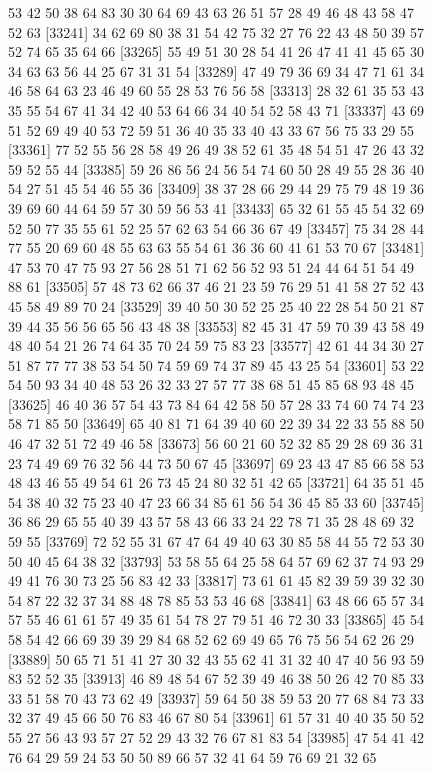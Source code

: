 \documentclass{article}
\begin{document}
\begin{figure}[H]
\begin{Schunk}
\begin{Soutput}
[33217] 53 42 50 38 64 83 30 30 64 69 43 63 26 51 57 28 49 46 48 43 58 47 52 63
[33241] 34 62 69 80 38 31 54 42 75 32 27 76 22 43 48 50 39 57 52 74 65 35 64 66
[33265] 55 49 51 30 28 54 41 26 47 41 41 45 65 30 34 63 63 56 44 25 67 31 31 54
[33289] 47 49 79 36 69 34 47 71 61 34 46 58 64 63 23 46 49 60 55 28 53 76 56 58
[33313] 28 32 61 35 53 43 35 55 54 67 41 34 42 40 53 64 66 34 40 54 52 58 43 71
[33337] 43 69 51 52 69 49 40 53 72 59 51 36 40 35 33 40 43 33 67 56 75 33 29 55
[33361] 77 52 55 56 28 58 49 26 49 38 52 61 35 48 54 51 47 26 43 32 59 52 55 44
[33385] 59 26 86 56 24 56 54 74 60 50 28 49 55 28 36 40 54 27 51 45 54 46 55 36
[33409] 38 37 28 66 29 44 29 75 79 48 19 36 39 69 60 44 64 59 57 30 59 56 53 41
[33433] 65 32 61 55 45 54 32 69 52 50 77 35 55 61 52 25 57 62 63 54 66 36 67 49
[33457] 75 34 28 44 77 55 20 69 60 48 55 63 63 55 54 61 36 36 60 41 61 53 70 67
[33481] 47 53 70 47 75 93 27 56 28 51 71 62 56 52 93 51 24 44 64 51 54 49 88 61
[33505] 57 48 73 62 66 37 46 21 23 59 76 29 51 41 58 27 52 43 45 58 49 89 70 24
[33529] 39 40 50 30 52 25 25 40 22 28 54 50 21 87 39 44 35 56 56 65 56 43 48 38
[33553] 82 45 31 47 59 70 39 43 58 49 48 40 54 21 26 74 64 35 70 24 59 75 83 23
[33577] 42 61 44 34 30 27 51 87 77 77 38 53 54 50 74 59 69 74 37 89 45 43 25 54
[33601] 53 22 54 50 93 34 40 48 53 26 32 33 27 57 77 38 68 51 45 85 68 93 48 45
[33625] 46 40 36 57 54 43 73 84 64 42 58 50 57 28 33 74 60 74 74 23 58 71 85 50
[33649] 65 40 81 71 64 39 40 60 22 39 34 22 33 55 88 50 46 47 32 51 72 49 46 58
[33673] 56 60 21 60 52 32 85 29 28 69 36 31 23 74 49 69 76 32 56 44 73 50 67 45
[33697] 69 23 43 47 85 66 58 53 48 43 46 55 49 54 61 26 73 45 24 80 32 51 42 65
[33721] 64 35 51 45 54 38 40 32 75 23 40 47 23 66 34 85 61 56 54 36 45 85 33 60
[33745] 36 86 29 65 55 40 39 43 57 58 43 66 33 24 22 78 71 35 28 48 69 32 59 55
[33769] 72 52 55 31 67 47 64 49 40 63 30 85 58 44 55 72 53 30 50 40 45 64 38 32
[33793] 53 58 55 64 25 58 64 57 69 62 37 74 93 29 49 41 76 30 73 25 56 83 42 33
[33817] 73 61 61 45 82 39 59 39 32 30 54 87 22 32 37 34 88 48 78 85 53 53 46 68
[33841] 63 48 66 65 57 34 57 55 46 61 61 57 49 35 61 54 78 27 79 51 46 72 30 33
[33865] 45 54 58 54 42 66 69 39 39 29 84 68 52 62 69 49 65 76 75 56 54 62 26 29
[33889] 50 65 71 51 41 27 30 32 43 55 62 41 31 32 40 47 40 56 93 59 83 52 52 35
[33913] 46 89 48 54 67 52 39 49 46 38 50 26 42 70 85 33 33 51 58 70 43 73 62 49
[33937] 59 64 50 38 59 53 20 77 68 84 73 33 32 37 49 45 66 50 76 83 46 67 80 54
[33961] 61 57 31 40 40 35 50 52 55 27 56 43 93 57 27 52 29 43 32 76 67 81 83 54
[33985] 47 54 41 42 76 64 29 59 24 53 50 50 89 66 57 32 41 64 59 76 69 21 32 65

\end{Soutput}
\end{Schunk}
\end{figure}
\end{document}
